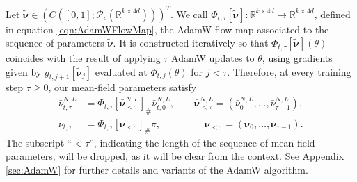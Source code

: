 \documentclass{article}
\newcommand{\R}{\mathbb{R}}
\begin{document}
Let $\widetilde{\bm\nu} \in (C([0,1]; \mathcal P_c(\R^{k\times 4d})))^T$. We call $\Phi_{t,\tau}[\widetilde{\bm\nu}]: \R^{k\times 4d}\mapsto \R^{k\times 4d}$, defined in equation \eqref{eqn:AdamWFlowMap}, the AdamW flow map associated to the sequence of parameters $\widetilde{\bm\nu}$. It is constructed iteratively so that $\Phi_{t,\tau}[\widetilde{\bm\nu}](\theta)$ coincides with the result of applying $\tau $ AdamW updates to $\theta$, using gradients given by $g_{t,j+1}[\widetilde{\bm\nu}_j]$ evaluated at $\Phi_{t,j}(\theta)$ for $j<\tau$.
Therefore, at every training step $\tau\ge 0$, our mean-field parameters satisfy
\begin{align}\label{eqn:barnu}
\bar\nu^{N,L}_{t,\tau} &=\Phi_{t,\tau}[\bm{\bar\nu}^{N,L}_{< \tau}]_\#\bar\nu^{N,L}_{t,0},\qquad
    \bm{\bar\nu}^{N,L}_{< \tau}=(\bar\nu^{N,L}_{0},\ldots, \bar\nu^{N,L}_{\tau-1}),\\
    \nu_{t,\tau} &=\Phi_{t,\tau}[\bm\nu_{< \tau}]_\#\pi,
    \qquad\qquad\,\,\, \bm\nu_{< \tau}=(\bm\nu_{0},\ldots,\bm\nu_{\tau-1}).\label{eqn:nu}
\end{align}
The subscript ``$<\tau$'', indicating the length of the sequence of mean-field parameters, will be dropped, as it will be clear from the context. See Appendix \ref{sec:AdamW} for further details and variants of the AdamW algorithm.

 
\end{document}
